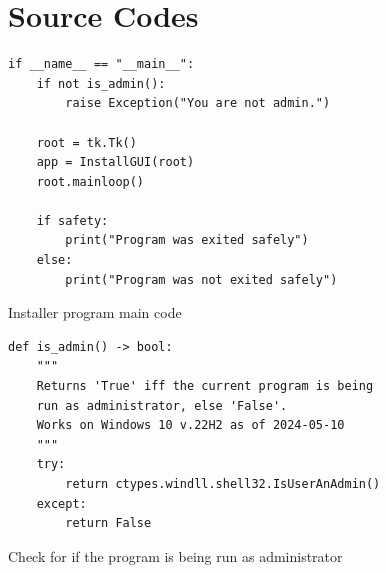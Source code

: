 \documentclass[11pt]{article}
\begin{document}
    \newpage
    \section{Source Codes}


        \begin{listing}[!ht]
            \begin{verbatim}
if __name__ == "__main__":
    if not is_admin():
        raise Exception("You are not admin.")
        
    root = tk.Tk()
    app = InstallGUI(root)
    root.mainloop()
    
    if safety:
        print("Program was exited safely")
    else:
        print("Program was not exited safely")
            \end{verbatim}
            \caption{Installer program main code}
            \label{sc:if_name_main_c1}
        \end{listing}


        \newpage
        \begin{listing}[!ht]
            \begin{verbatim}
def is_admin() -> bool:
    """
    Returns 'True' iff the current program is being 
    run as administrator, else 'False'. 
    Works on Windows 10 v.22H2 as of 2024-05-10
    """
    try:
        return ctypes.windll.shell32.IsUserAnAdmin()
    except:
        return False
            \end{verbatim}
            \caption{Check for if the program is being run as administrator}
            \label{sc:admin_checker}
        \end{listing}
\end{document}
